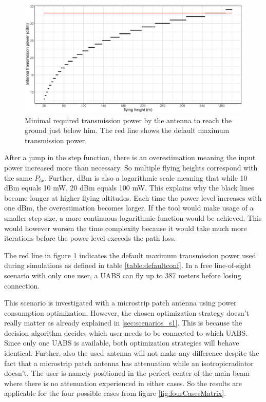 \begin{figure}[t]
  \centering
  \includegraphics[width=\textwidth]{../results/s1/ptx.png}
  \caption{Minimal required transmission power by the antenna to reach the ground just below him. The red line shows the default maximum transmission power.}
  \label{fig:ptxfh}
\end{figure}

After a jump in the step function, there is an overestimation meaning the input power increased more than necessary. So multiple flying heights correspond with the same $P_{tx}$.
Further, dBm is also a logarithmic scale meaning that while 10 dBm equals 10 mW, 20 dBm equals 100 mW. This explains why the black lines become longer at higher flying altitudes.
Each time the power level increases with one dBm, the overestimation becomes larger. If the tool would make usage of a smaller step size, a more continuous 
logarithmic function would be achieved. This would however worsen the time complexity because it would take much more iterations before 
the power level exceeds the path loss. 

The red line in figure \ref{fig:ptxfh} indicates the default maximum transmission power used during simulations as 
defined in table \ref{table:defaultconf}. 
In a free line-of-sight scenario with only one user, a \gls{UABS} can fly up to 387 meters before losing connection.

This scenario is investigated with a microstrip patch antenna using power consumption optimization. 
 However, the chosen optimization strategy doesn't really matter as already explained in  \ref{sec:scenarios_s1}. This is because the decision 
 algorithm decides which user 
needs to be connected to which \gls{UABS}. Since only one \gls{UABS} is available, both optimization strategies will behave identical.
Further, also the used antenna will not make any difference
despite the fact that a microstrip patch antenna has attenuation while an \gls{isotropicradiator} doesn't.
The user is namely positioned in the perfect center of the main beam where there is 
no attenuation experienced in either cases. So the results are applicable for the four possible cases from figure \ref{fig:fourCasesMatrix}.

